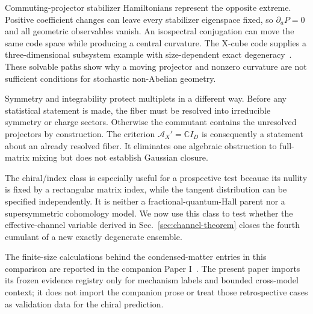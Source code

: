 Commuting-projector stabilizer Hamiltonians represent the opposite extreme.  Positive coefficient changes can leave every stabilizer eigenspace fixed, so $\partial_aP=0$ and all geometric observables vanish.  An isospectral conjugation can move the same code space while producing a central curvature.  The X-cube code supplies a three-dimensional subsystem example with size-dependent exact degeneracy~\cite{vijay2016xcube}.  These solvable paths show why a moving projector and nonzero curvature are not sufficient conditions for stochastic non-Abelian geometry.

Symmetry and integrability protect multiplets in a different way.  Before any statistical statement is made, the fiber must be resolved into irreducible symmetry or charge sectors.  Otherwise the commutant contains the unresolved projectors by construction.  The criterion $\mathcal A_X'=\mathbb C I_D$ is consequently a statement about an already resolved fiber.  It eliminates one algebraic obstruction to full-matrix mixing but does not establish Gaussian closure.

The chiral/index class is especially useful for a prospective test because its nullity is fixed by a rectangular matrix index, while the tangent distribution can be specified independently.  It is neither a fractional-quantum-Hall parent nor a supersymmetric cohomology model.  We now use this class to test whether the effective-channel variable derived in Sec.~\ref{sec:channel-theorem} closes the fourth cumulant of a new exactly degenerate ensemble.

The finite-size calculations behind the condensed-matter entries in this comparison are reported in the companion Paper I~\cite{wang2026exactdegenerate}.  The present paper imports its frozen evidence registry only for mechanism labels and bounded cross-model context; it does not import the companion prose or treat those retrospective cases as validation data for the chiral prediction.
